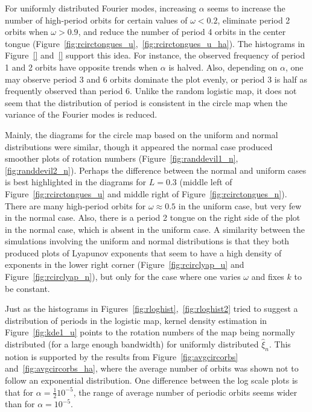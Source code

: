 For uniformly distributed Fourier modes, increasing $\alpha$ seems to increase the number of
high-period orbits for certain values of $\omega < 0.2$, eliminate period
2 orbits when $\omega >0.9$, and reduce the number of period 4 orbits
in the center tongue
(Figure~\ref{fig:rcirctongues_u},~\ref{fig:rcirctongues_u_ha}). The
histograms in Figure~\ref{} and~\ref{} support this idea. For
instance, the observed frequency of
period 1 and 2 orbits have opposite trends when $\alpha$ is
halved. Also, depending on $\alpha$, one may observe period 3 and 6 orbits dominate the plot evenly, or period 3 is half as frequently observed than
period 6. Unlike the random logistic map, it does not seem that the
distribution of period is consistent in the circle map when the
variance of the Fourier modes is reduced.  

Mainly, the diagrams for the circle map based on the uniform and
normal distributions were similar, though it appeared the normal
case produced smoother plots of rotation numbers
(Figure~\ref{fig:randdevil1_n}, \ref{fig:randdevil2_n}). Perhaps the
difference between the normal and uniform cases is best highlighted in
the diagrams for $L = 0.3$ (middle left of
Figure~\ref{fig:rcirctongues_u} and middle right of
Figure~\ref{fig:rcirctongues_n}). There are many high-period orbits
for $\omega\approx 0.5$ in the uniform case, but very
few in the normal case. Also, there is a period 2 tongue on the right
side of the plot in the normal case, which is absent in the uniform
case. A similarity between the simulations involving the uniform and normal
distributions is that they both produced plots of Lyapunov exponents that seem to have a
high density of exponents in the lower right corner
(Figure~\ref{fig:rcirclyap_u} and Figure~\ref{fig:rcirclyap_n}), but
only for the case where one varies $\omega$ and fixes $k$ to be
constant.

Just as the histograms in Figures~\ref{fig:rloghist},~\ref{fig:rloghist2} tried to suggest a
distribution of periods in the logistic map, kernel density estimation
in Figure~\ref{fig:kde1_u} points to the rotation numbers of the map
being normally distributed (for a large enough bandwidth) for
uniformly distributed $\hat{\xi}_n$. This notion is supported by the
results from Figure~\ref{fig:avgcircorbs} and~\ref{fig:avgcircorbs_ha}, where the average number of orbits was shown not to follow an exponential
distribution. One difference between the log scale plots is that for $\alpha=\frac{1}{2}10^{-5}$, the range
of average number of periodic orbits seems wider than for
$\alpha=10^{-5}$. 

